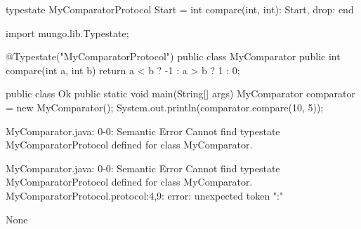 \begin{code}
typestate MyComparatorProtocol {
  Start = {
    int compare(int, int): Start,
    drop: end
  }
}\end{code}

\begin{code}
import mungo.lib.Typestate;

@Typestate("MyComparatorProtocol")
public class MyComparator {
  public int compare(int a, int b) {
    return a < b ? -1 : a > b ? 1 : 0;
  }
}\end{code}

\begin{code}
public class Ok {
	public static void main(String[] args) {
		MyComparator comparator = new MyComparator();
    System.out.println(comparator.compare(10, 5));
	}
}\end{code}

\lstset{language=,caption=Mungo's output}
\begin{code}

MyComparator.java: 0-0: Semantic Error
		Cannot find typestate MyComparatorProtocol defined for class MyComparator.

MyComparator.java: 0-0: Semantic Error
		Cannot find typestate MyComparatorProtocol defined for class MyComparator.
MyComparatorProtocol.protocol:4,9: error: unexpected token ":"
\end{code}

\lstset{language=,caption=Our tool's output}
\begin{code}
None
\end{code}

